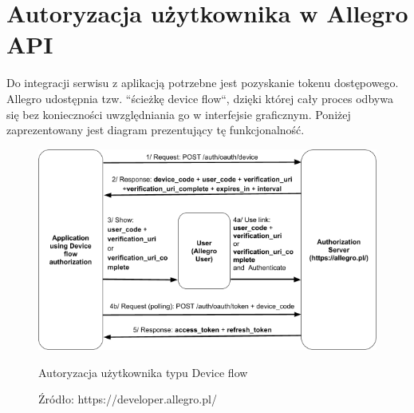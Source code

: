 
\section{Autoryzacja użytkownika w Allegro API}

Do integracji serwisu z aplikacją potrzebne jest pozyskanie tokenu dostępowego. Allegro udostępnia tzw. ``ścieżkę device flow``, dzięki której cały proces odbywa się bez konieczności uwzględniania go w interfejsie graficznym. Poniżej zaprezentowany jest diagram prezentujący tę funkcjonalność.

\begin{figure}[H]
	\centering
	\includegraphics[width=\linewidth]{device_flow.png}
	\caption{Autoryzacja użytkownika typu Device flow}
	\caption*{Źródło: {https://developer.allegro.pl/}}
\end{figure}

